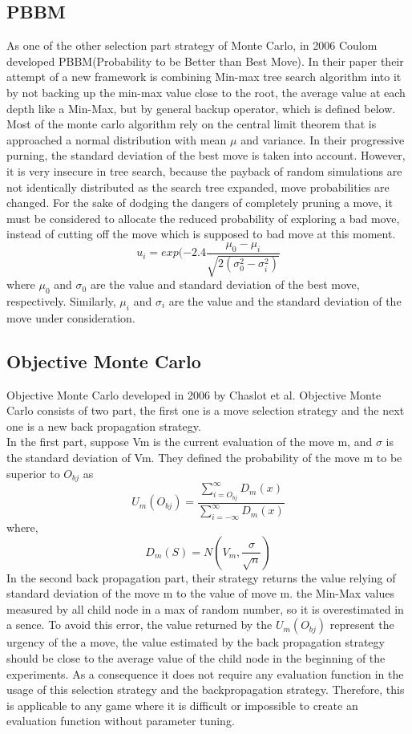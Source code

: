 \documentclass[12pt]{article}
\begin{document}
\subsection{PBBM}
As one of the other selection part strategy of Monte Carlo, in 2006 Coulom developed PBBM(Probability to be Better than Best Move)\cite{coulom2006efficient}. In their paper their attempt of a new framework is combining Min-max tree search algorithm into it by not backing up the min-max value close to the root, the average value at each depth like a Min-Max, but by general backup operator, which is defined below. 
Most of the monte carlo algorithm rely on the central limit theorem that is approached a normal distribution with mean \(\mu\) and variance. In their progressive purning, the standard deviation of the best move is taken into account. However, it is very insecure in tree search, because the payback of random simulations are not identically distributed as the search tree expanded, move probabilities are changed. For the sake of dodging the dangers of completely pruning a move, it must be considered to allocate the reduced probability of exploring a bad move, instead of cutting off the move which is supposed to bad move at this moment.   
\[u_{i} = exp(-2.4\frac{\mu_{0} - \mu_{i}}{\sqrt{2(\sigma^2_{0} - \sigma^2_{i})}}\]
where \(\mu_{0}\) and \(\sigma_{0}\) are the value and standard deviation of the best move, respectively. Similarly, \(\mu_{i}\) and \(\sigma_{i}\) are the value and the standard deviation of the move under consideration.
\subsection{Objective Monte Carlo}
Objective Monte Carlo developed in 2006 by Chaslot et al\cite{chaslot2006monte}. Objective Monte Carlo consists of two part, the first one is a move selection strategy and the next one is a new back propagation strategy. \\
In the first part, suppose Vm is the current evaluation of the move m, and \(\sigma\) is the standard deviation of Vm. They defined the probability of the move m to be superior to \(O_{bj}\) as 
\[U_{m}(O_{bj}) = \frac{\sum_{i=O_{bj}}^{\infty} D_{m}(x)}{\sum_{i=-\infty}^{\infty} D_{m}(x)}\]
where, \[D_{m}(S) = N(V_{m}, \frac{\sigma}{\sqrt n}) \]
In the second back propagation part, their strategy returns the value relying of standard deviation of the move m to the value of move m. the Min-Max values measured by all child node in a max of random number, so it is overestimated in a sence. To avoid this error, the value returned by the 
\(U_{m}(O_{bj})\) represent the urgency of the a move, the value estimated by the back propagation strategy should be close to the average value of the child node in the beginning of the experiments.
As a consequence it does not require any evaluation function in the usage of this selection strategy and the backpropagation strategy. Therefore, this is applicable to any game where it is difficult or impossible  to create an evaluation function without parameter tuning.
\end{document}
